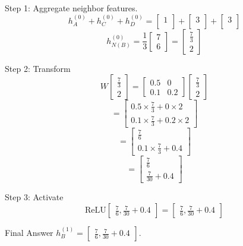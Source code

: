 \documentclass[a4paper,12pt]{article}
\begin{document}
\begin{enumerate}[label=\textbf{Q\arabic*.}]
    Step 1: Aggregate neighbor features.
    \[
    h_A^{(0)} + h_C^{(0)} + h_D^{(0)} = \begin{bmatrix} 1 \\ \end{bmatrix} + \begin{bmatrix} 3 \\ \end{bmatrix} + \begin{bmatrix} 3 \\ \end{bmatrix}
    \]
    \[
    h_{N(B)}^{(0)} = \frac{1}{3} \begin{bmatrix} 7 \\ 6 \end{bmatrix} = \begin{bmatrix} \frac{7}{3} \\ 2 \end{bmatrix}
    \]

    Step 2: Transform
    \[
    W \begin{bmatrix} \frac{7}{3} \\ 2 \end{bmatrix} = \begin{bmatrix} 0.5 & 0 \\ 0.1 & 0.2 \end{bmatrix} \begin{bmatrix} \frac{7}{3} \\ 2 \end{bmatrix}
    \]
    \[
    = \begin{bmatrix} 0.5 \times \frac{7}{3} + 0 \times 2 \\ 0.1 \times \frac{7}{3} + 0.2 \times 2 \end{bmatrix}
    \]
    \[
    = \begin{bmatrix} \frac{7}{6} \\ 0.1 \times \frac{7}{3} + 0.4 \end{bmatrix}
    \]
    \[
    = \begin{bmatrix} \frac{7}{6} \\ \frac{7}{30} + 0.4 \end{bmatrix}
    \]

    Step 3: Activate
    \[
    \text{ReLU} \begin{bmatrix} \frac{7}{6}, \frac{7}{30} + 0.4 \end{bmatrix} = \begin{bmatrix} \frac{7}{6}, \frac{7}{30} + 0.4 \end{bmatrix}
    \]

    Final Answer \(h_B^{(1)} = \begin{bmatrix} \frac{7}{6}, \frac{7}{30} + 0.4 \end{bmatrix}\).
    
\end{enumerate}
\end{document}
